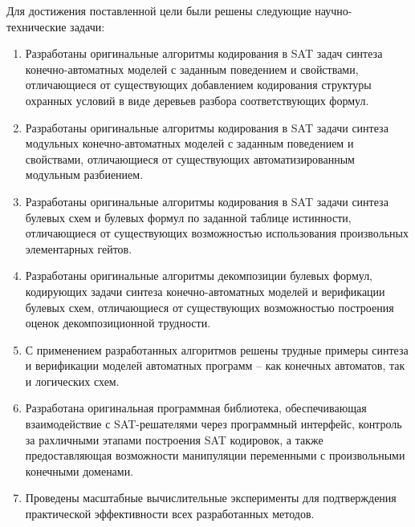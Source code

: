 \tasks
%
Для достижения поставленной цели были решены следующие научно-технические задачи:
\begin{enumerate}[beginpenalty=10000]
    \item Разработаны оригинальные алгоритмы кодирования в SAT задач синтеза конечно-автоматных моделей с заданным поведением и свойствами, отличающиеся от существующих добавлением кодирования структуры охранных условий в виде деревьев разбора соответствующих формул.
    \item Разработаны оригинальные алгоритмы кодирования в SAT задачи синтеза модульных конечно-автоматных моделей с заданным поведением и свойствами, отличающиеся от существующих автоматизированным модульным разбиением.
    \item Разработаны оригинальные алгоритмы кодирования в SAT задачи синтеза булевых схем и булевых формул по заданной таблице истинности, отличающиеся от существующих возможностью использования произвольных элементарных гейтов.
    \item Разработаны оригинальные алгоритмы декомпозиции булевых формул, кодирующих задачи синтеза конечно-автоматных моделей и верификации булевых схем, отличающиеся от существующих возможностью построения оценок декомпозиционной трудности.
    \item С применением разработанных алгоритмов решены трудные примеры синтеза и верификации моделей автоматных программ \--- как конечных автоматов, так и логических схем.
    \item Разработана оригинальная программная библиотека, обеспечивающая взаимодействие с SAT-решателями через программный интерфейс, контроль за рахличными этапами построения SAT кодировок, а также предоставляющая возможности манипуляции переменными с произвольными конечными доменами.
    \item Проведены масштабные вычислительные эксперименты для подтверждения практической эффективности всех разработанных методов.
\end{enumerate}


